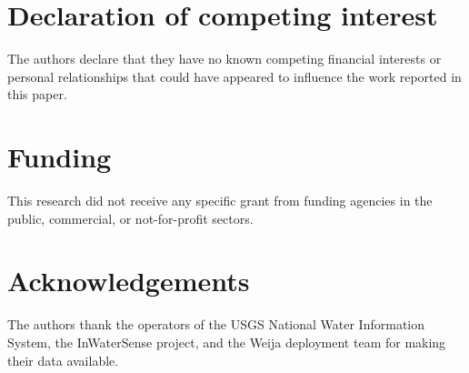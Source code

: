 \section*{Declaration of competing interest}
The authors declare that they have no known competing financial interests or personal relationships that could have appeared to influence the work reported in this paper.

\section*{Funding}
This research did not receive any specific grant from funding agencies in the public, commercial, or not-for-profit sectors.

\section*{Acknowledgements}
The authors thank the operators of the USGS National Water Information System, the InWaterSense project, and the Weija deployment team for making their data available.
